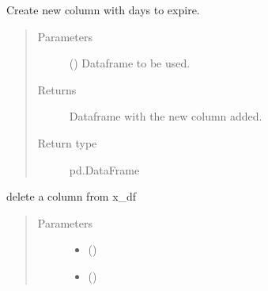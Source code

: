 \documentclass[letterpaper,10pt,english]{sphinxmanual}
\begin{document}
\begin{fulllineitems}
\label{\detokenize{source/optimization.datatools:optimization.datatools.dataprep.days_to_expire}}
Create new column with days to expire.
\begin{quote}\begin{description}
\item[{Parameters}] \leavevmode
{} () \textendash{} Dataframe to be used.

\item[{Returns}] \leavevmode
{} \textendash{} Dataframe with the new column added.

\item[{Return type}] \leavevmode
pd.DataFrame

\end{description}\end{quote}

\end{fulllineitems}


\begin{fulllineitems}
\label{\detokenize{source/optimization.datatools:optimization.datatools.dataprep.delete_column}}
delete a column from x\_df
\begin{quote}\begin{description}
\item[{Parameters}] \leavevmode\begin{itemize}
\item {} 
 () \textendash{} 

\item {} 
 () \textendash{} 

\end{itemize}

\end{description}\end{quote}

\end{fulllineitems}
\end{document}
